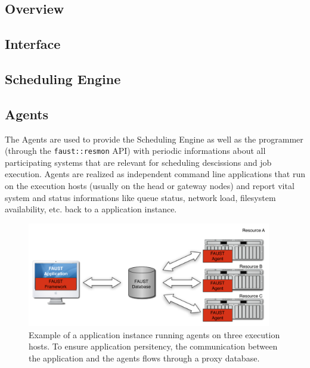 \subsection{Overview}

\subsection{Interface}

\subsection{Scheduling Engine}

\subsection{Agents}

The Agents are used to provide the Scheduling Engine as well as the programmer (through the \texttt{faust::resmon} API) with periodic informations about all participating systems that are relevant for scheduling descissions and job execution. \FAUST Agents are realized as independent command line applications that run on the execution hosts (usually on the head or gateway nodes) and report vital system and status informations like queue status, network load, filesystem availability, etc. back to a \FAUST application instance.

\begin{figure}[bth!]
  \begin{center}
    \includegraphics[width=0.95\textwidth]{../figures/faust_agents_01}
    \caption{\label{fig:faust_agents_01} Example of a \FAUST application 
      instance running agents on three execution hosts. To ensure 
      application persitency, the communication between the application
      and the agents flows through a proxy database. }
  \end{center}
\end{figure}

